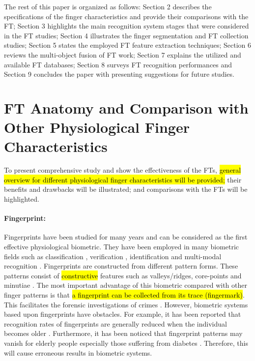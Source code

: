 \documentclass[review]{elsarticle}
\begin{document}
	The rest of this paper is organized as follows: Section 2 describes the specifications of the finger characteristics and provide their comparisons with the FT; Section 3 highlights the main recognition system stages that were considered in the FT studies; Section 4 illustrates the finger segmentation and FT collection studies; Section 5 states the employed FT feature extraction techniques; Section 6 reviews the multi-object fusion of FT work; Section 7 explains the utilized and available FT databases; Section 8 surveys FT recognition performances and Section 9 concludes the paper with presenting suggestions for future studies.

\section{FT Anatomy and Comparison with Other Physiological Finger Characteristics}
	To present comprehensive study and show the effectiveness of the FTs, \hl{general overview for different physiological finger characteristics will be provided;} their benefits and drawbacks will be illustrated; and comparisons with the FTs will be highlighted.
	\paragraph{\textbf{Fingerprint:}} Fingerprints have been studied for many years and can be considered as the first effective physiological biometric. They have been employed in many biometric fields such as classification \cite{Halici1996Fingerprint}, verification \cite{Gil2013Fingerprint}, identification \cite{Bifari2014Automated} and multi-modal recognition \cite{Conti2010AFrequency}. Fingerprints are constructed from different pattern forms. 
	These patterns consist of \hl{constructive} features such as valleys/ridges, core-points and minutiae \cite{mukhaiyar2015cancellable}. The most important advantage of this biometric compared with other finger patterns is that \hl{a fingerprint can be collected from its trace (fingermark)}. This facilitates the forensic investigations of crimes \cite{Makrushin2015Forensic,Kotzerke2015Discriminating,Merkel2014Latent,Ezeobiejesi2016Latent,Zhang2014Adaptive,Paulino2013Latent}. However, biometric systems based upon fingerprints have obstacles. For example, it has been reported that recognition rates of fingerprints are generally reduced when the individual becomes older \cite{Modi2007Impact}. Furthermore, it has been noticed that fingerprint patterns may vanish for elderly people especially those suffering from diabetes \cite{kabadi1991classification}. Therefore, this will cause erroneous results in biometric systems. 
	
\end{document}
